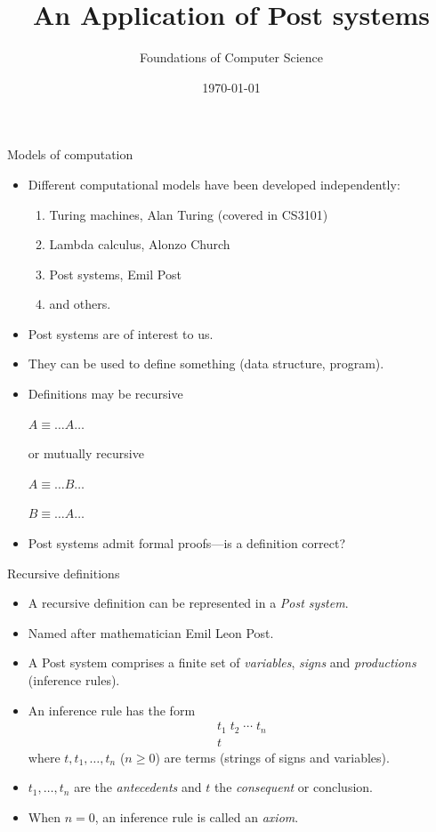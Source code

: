 \documentclass[style=sailor,size=12pt]{powerdot}
\title{An Application of Post systems}
\author{Foundations of Computer Science}
\date{\today}
\begin{document}
\maketitle

\begin{wideslide}[bm=,toc=]{Models of computation}
\begin{itemize}
\item Different computational models have been developed independently:
\begin{enumerate}
\item Turing machines, Alan Turing (covered in CS3101)
\item Lambda calculus, Alonzo Church
\item Post systems, Emil Post
\item and others.
\end{enumerate}
\item Post systems are of interest to us.
\item They can be used to define something (data structure, program).
\item Definitions may be recursive 

\hspace{2em}$A \equiv \ldots A\ldots$

or mutually recursive

\hspace{2em}$A \equiv \ldots B\ldots$

\hspace{2em}$B \equiv \ldots A\ldots$

\item Post systems admit formal proofs---is a definition correct?
\end{itemize}
\end{wideslide}

\begin{wideslide}[bm=,toc=]{Recursive definitions}
\begin{itemize}
\item A recursive definition can be represented in a {\em Post system\/}.
\item Named after mathematician Emil Leon Post.
\item A Post system comprises a finite set of {\em variables\/}, {\em signs\/} and {\em productions\/} 
(inference rules).
\item An inference rule has the form
\begin{displaymath}
\begin{array}{c}
t_1\;t_2\;\cdots\;t_n\\
\hline
t
\end{array}
\end{displaymath}
where $t,t_1,\ldots ,t_n$ ($n\geq 0$) are terms (strings of signs and variables).
\item $t_1,\ldots , t_n$ are the {\em antecedents\/} and $t$ the {\em consequent\/} or conclusion.
\item When $n=0$, an inference rule is called an {\em axiom\/}.
\end{itemize}
\end{wideslide}
\end{document}
